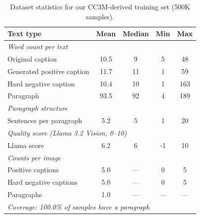 \begin{table}[t]
\centering
\caption{Dataset statistics for our CC3M-derived training set (500K samples).}
\label{tab:supp_dataset_stats}
\small
\setlength{\tabcolsep}{5pt}
\begin{tabular}{lcccc}
\toprule
\textbf{Text type} & \textbf{Mean} & \textbf{Median} & \textbf{Min} & \textbf{Max} \\
\midrule
\multicolumn{5}{l}{\textit{Word count per text}} \\
\midrule
Original caption & 10.5 & 9 & 5 & 48 \\
Generated positive caption & 11.7 & 11 & 1 & 59 \\
Hard negative caption & 10.4 & 10 & 1 & 163 \\
Paragraph & 93.5 & 92 & 4 & 189 \\
\midrule
\multicolumn{5}{l}{\textit{Paragraph structure}} \\
\midrule
Sentences per paragraph & 5.2 & 5 & 1 & 20 \\
\midrule
\multicolumn{5}{l}{\textit{Quality score (Llama 3.2 Vision, 0--10)}} \\
\midrule
Llama score & 6.2 & 6 & -1 & 10 \\
\midrule
\multicolumn{5}{l}{\textit{Counts per image}} \\
\midrule
Positive captions & 5.0 & --- & 0 & 5 \\
Hard negative captions & 5.0 & --- & 0 & 5 \\
Paragraphs & 1.0 & --- & --- & --- \\
\midrule
\multicolumn{5}{l}{\textit{Coverage: 100.0\% of samples have a paragraph}} \\
\bottomrule
\end{tabular}
\end{table}
